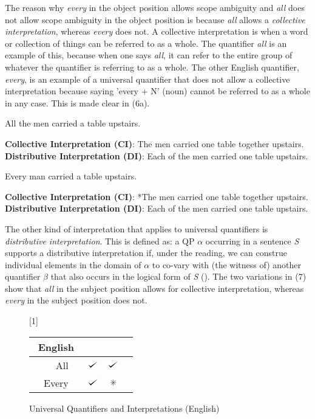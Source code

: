 \documentclass[english, 11pt]{article}
\newcommand{\dwork}{\text{\ding{83}}}
\def\checkmark{\tikz\fill[scale=0.4](0,.35) -- (.25,0) -- (1,.7) -- (.25,.15) -- cycle;}
\begin{document}
The reason why \emph{every} in the object position allows scope ambiguity and \emph{all} does not allow scope ambiguity in the object position is because \emph{all} allows a \emph{collective interpretation}, whereas \emph{every} does not. A collective interpretation is when a word or collection of things can be referred to as a whole. The quantifier \emph{all} is an example of this, because when one says \emph{all}, it can refer to the entire group of whatever the quantifier is referring to as a whole. The other English quantifier, \emph{every}, is an example of a universal quantifier that does not allow a collective interpretation because saying 'every + N' (noun) cannot be referred to as a whole in any case. This is made clear in (6a). 

\begin {exe}
	\ex 
		\begin {xlist}
			\ex All the men carried a table upstairs.
			\begin {xlist} 
				\ex \textbf{Collective Interpretation (CI)}: The men carried one table together upstairs.
				\ex \textbf{Distributive Interpretation (DI)}: Each of the men carried one table upstairs.
			\end {xlist}
			\ex Every man carried a table upstairs.
				\begin {xlist} 
					\ex \textbf{Collective Interpretation (CI)}: *The men carried one table together upstairs.
					\ex \textbf{Distributive Interpretation (DI)}: Each of the men carried one table upstairs.
				\end {xlist}
	\end {xlist}
\end {exe}
The other kind of interpretation that applies to universal quantifiers is \emph{distributive interpretation}. This is defined as: a QP $\alpha$ occurring in a sentence \emph{S} supports a distributive interpretation if, under the reading, we can construe individual elements in the domain of $\alpha$ to co-vary with (the witness of) another quantifier $\beta$ that also occurs in the logical form of \emph{S} (\cite{s1}). The two variations in (7) show that \emph{all} in the subject position allows for collective interpretation, whereas \emph{every} in the subject position does not.
\begin{figure}[h]
	\begin{center} \renewcommand*\arraystretch{1.2}
	\scalebox{1}[1]{\begin{tabular}[t]{|rrl||c|c|c|} \hline 
	\multicolumn{3}{|c||}{English} & \sc{Distributive} & \sc{Collective}  \\[0.5ex]
  	 	\hline & All 		& & $\checkmark$ & $\checkmark$ \\
		\hline & Every 	& & $\checkmark$ & $\dwork$ \\
   	 	\hline 
	\end{tabular}} \renewcommand*\arraystretch{1} \end{center}
	\vspace*{-5mm}
	\captionsetup{labelfont=bf}
	\caption[labelfont=bf]{Universal Quantifiers and Interpretations (English)}
\end{figure}
\end{document}
